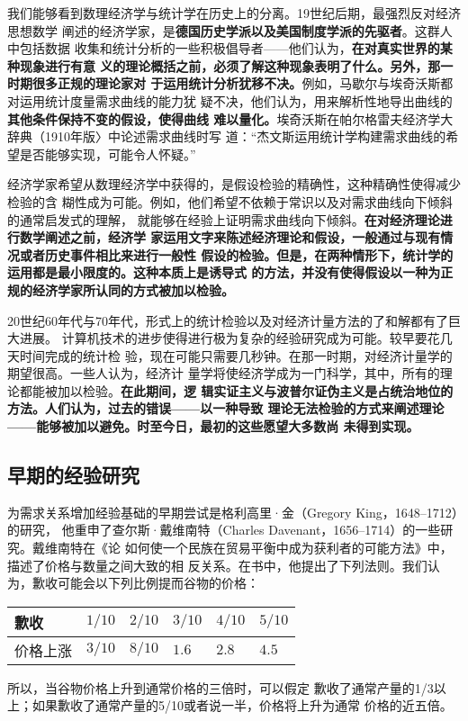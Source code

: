 我们能够看到数理经济学与统计学在历史上的分离。19世纪后期，最强烈反对经济思想数学
阐述的经济学家，是\textbf{德国历史学派以及美国制度学派的先驱者}。这群人中包括数据
收集和统计分析的一些积极倡导者——他们认为，\textbf{在对真实世界的某种现象进行有意
  义的理论概括之前，必须了解这种现象表明了什么。另外，那一时期很多正规的理论家对
  于运用统计分析犹移不决。}例如，马歇尔与埃奇沃斯都对运用统计度量需求曲线的能力犹
疑不决，他们认为，用来解析性地导出曲线的\textbf{其他条件保持不变的假设，使得曲线
  难以量化。}埃奇沃斯在帕尔格雷夫经济学大辞典（1910年版〉中论述需求曲线时写
道：“杰文斯运用统计学构建需求曲线的希望是否能够实现，可能令人怀疑。”

经济学家希望从数理经济学中获得的，是假设检验的精确性，这种精确性使得减少检验的含
糊性成为可能。例如，他们希望不依赖于常识以及对需求曲线向下倾斜的通常启发式的理解，
就能够在经验上证明需求曲线向下倾斜。\textbf{在对经济理论进行数学阐述之前，经济学
  家运用文字来陈述经济理论和假设，一般通过与现有情况或者历史事件相比来进行一般性
  假设的检验。但是，在两种情形下，统计学的运用都是最小限度的。这种本质上是诱导式
  的方法，并没有使得假设以一种为正规的经济学家所认同的方式被加以检验。}

20世纪60年代与70年代，形式上的统计检验以及对经济计量方法的了和解都有了巨大进展。
计算机技术的进步使得进行极为复杂的经验研究成为可能。较早要花几天时间完成的统计检
验，现在可能只需要几秒钟。在那一时期，对经济计量学的期望很高。一些人认为，经济计
量学将使经济学成为一门科学，其中，所有的理论都能被加以检验。\textbf{在此期间，逻
  辑实证主义与波普尔证伪主义是占统治地位的方法。人们认为，过去的错误——以一种导致
  理论无法检验的方式来阐述理论——能够被加以避免。时至今日，最初的这些愿望大多数尚
  未得到实现。}

\subsection{早期的经验研究}

为需求关系增加经验基础的早期尝试是格利高里·金（Gregory King，1648--1712）的研究，
他重申了查尔斯·戴维南特（Charles Davenant，1656--1714）的一些研究。戴维南特在《论
如何使一个民族在贸易平衡中成为获利者的可能方法》中，描述了价格与数量之间大致的相
反关系。在书中，他提出了下列法则。我们认为，歉收可能会以下列比例提而谷物的价格：

\begin{table}[htbp]
  \centering
    \begin{tabularx}{.9\linewidth}{@{}|l|X|X|X|X|X|@{}}
      \hline
    歉收    & $1/10$ & $2/10$ & $3/10$ & $4/10$ & $5/10$ \\ \hline
    价格上涨 & $3/10$ & $8/10$ & $1.6$ & $2.8$ & $4.5$ \\ \hline
    \end{tabularx}%

    \bigskip \raggedright\small 所以，当谷物价格上升到通常价格的三倍时，可以假定
    歉收了通常产量的1/3以上；如果歉收了通常产量的5/10或者说一半，价格将上升为通常
    价格的近五倍。
\end{table}


